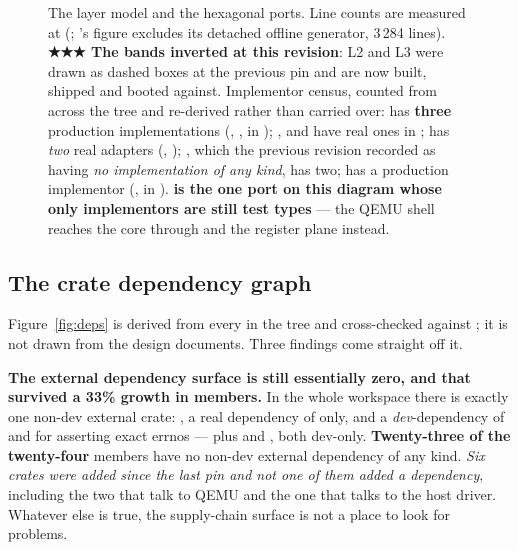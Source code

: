 \documentclass[10.5pt]{article}
\begin{document}
\begin{landscape}\begin{figure}[p]
\centering
{}
\caption{The layer model and the hexagonal ports. Line counts are measured at 
(; 's figure excludes its detached offline
generator, 3\,284 lines). \textbf{★★★ The bands inverted at this revision}: L2 and L3 were drawn
as dashed \unbuilt{} boxes at the previous pin and are now built, shipped and booted against.
Implementor census, counted from  across the tree and re-derived rather
than carried over:  has \textbf{three} production implementations
(, ,  in );
,  and  have real ones in
;  has \emph{two} real adapters (,
); , which the previous revision recorded as having \emph{no
implementation of any kind}, has two;  has a production implementor
(, in ). \textbf{ is the one port on this
diagram whose only implementors are still test types} — the QEMU shell reaches the core through
 and the register plane instead.}
\label{fig:layers}
\end{figure}\end{landscape}

\subsection{The crate dependency graph}

Figure~\ref{fig:deps} is derived from every  in the tree and cross-checked
against ; it is not drawn from the design documents. Three findings come
straight off it.

\textbf{The external dependency surface is still essentially zero, and that survived a 33\%
growth in members.} In the whole workspace there is exactly one non-dev external crate:
, a real dependency of  only, and a \emph{dev}-dependency of
 and  for asserting exact errnos — plus  and
, both dev-only. \textbf{Twenty-three of the twenty-four} members have no non-dev
external dependency of any kind. \emph{Six crates were added since the last pin and not one of
them added a dependency}, including the two that talk to QEMU and the one that talks to the host
driver. Whatever else is true, the supply-chain surface is not a place to look for problems.
\end{document}
